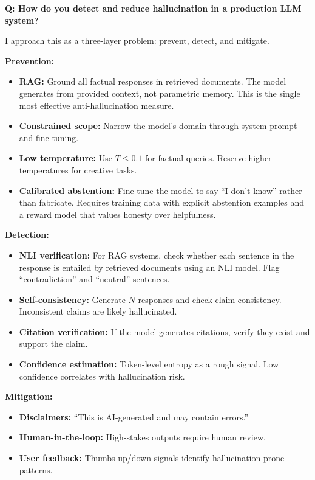 
\begin{interviewq}
\textbf{Q: How do you detect and reduce hallucination in a production LLM system?}

 \quad {} \quad \badgefreq{\freqhigh}

\stronganswer

I approach this as a three-layer problem: prevent, detect, and mitigate.

\textbf{Prevention:}
\begin{itemize}
    \item \textbf{RAG:} Ground all factual responses in retrieved documents. The model generates from provided context, not parametric memory. This is the single most effective anti-hallucination measure.
    \item \textbf{Constrained scope:} Narrow the model's domain through system prompt and fine-tuning.
    \item \textbf{Low temperature:} Use $T \leq 0.1$ for factual queries. Reserve higher temperatures for creative tasks.
    \item \textbf{Calibrated abstention:} Fine-tune the model to say ``I don't know'' rather than fabricate. Requires training data with explicit abstention examples and a reward model that values honesty over helpfulness.
\end{itemize}

\textbf{Detection:}
\begin{itemize}
    \item \textbf{NLI verification:} For RAG systems, check whether each sentence in the response is entailed by retrieved documents using an NLI model. Flag ``contradiction'' and ``neutral'' sentences.
    \item \textbf{Self-consistency:} Generate $N$ responses and check claim consistency. Inconsistent claims are likely hallucinated.
    \item \textbf{Citation verification:} If the model generates citations, verify they exist and support the claim.
    \item \textbf{Confidence estimation:} Token-level entropy as a rough signal. Low confidence correlates with hallucination risk.
\end{itemize}

\textbf{Mitigation:}
\begin{itemize}
    \item \textbf{Disclaimers:} ``This is AI-generated and may contain errors.''
    \item \textbf{Human-in-the-loop:} High-stakes outputs require human review.
    \item \textbf{User feedback:} Thumbs-up/down signals identify hallucination-prone patterns.
\end{itemize}


\end{interviewq}

